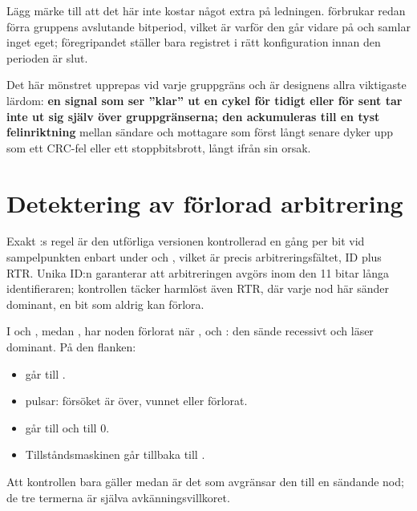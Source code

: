 Lägg märke till att det här inte kostar något extra på ledningen.  förbrukar
redan förra gruppens avslutande bitperiod, vilket är varför den går vidare på  och
samlar inget eget; föregripandet ställer bara registret i rätt konfiguration innan den perioden är
slut.

\begin{warning}
Det här mönstret upprepas vid varje gruppgräns och är designens allra viktigaste lärdom: \textbf{en
signal som ser ”klar” ut en cykel för tidigt eller för sent tar inte ut sig själv över
gruppgränserna; den ackumuleras till en tyst felinriktning} mellan sändare och mottagare som först
långt senare dyker upp som ett CRC-fel eller ett stoppbitsbrott, långt ifrån sin orsak.
\end{warning}

\section{Detektering av förlorad arbitrering}
\label{c17:sec:arbitration}

Exakt :s regel \textemdash{}  är den utförliga versionen
\textemdash{} kontrollerad en gång per bit vid sampelpunkten enbart under  och
, vilket är precis arbitreringsfältet, ID plus RTR.
Unika ID:n garanterar att arbitreringen avgörs inom den 11 bitar långa identifieraren; kontrollen
täcker harmlöst även RTR, där varje nod här sänder dominant, en bit som aldrig kan förlora.

I  och , medan , har noden förlorat när
,  och : den sände recessivt och
läser dominant. På den flanken:
\begin{itemize}
  \item {} går till .
  \item {} pulsar: försöket är över, vunnet eller förlorat.
  \item {} går till  och  till 0.
  \item Tillståndsmaskinen går tillbaka till .
\end{itemize}

Att kontrollen bara gäller medan  är det som avgränsar den till en sändande nod; de
tre termerna är själva avkänningsvillkoret.

